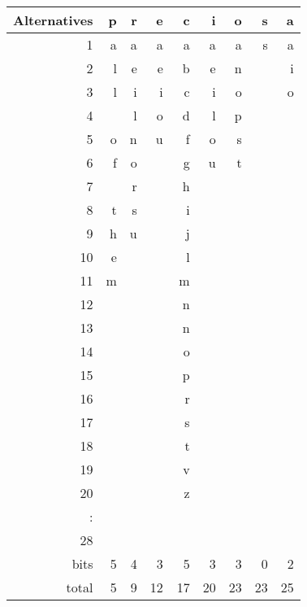 \documentclass{article}
\begin{document}
\thispagestyle{empty}
\begin{tabular}{r|rrrrrrrr}
    Alternatives & p & r & e & c & i & o & s & a\\
    \hline
     1 & a & a & a & a & a & a & s & a\\
     2 & l & e & e & b & e & n &   & i\\
     3 & l & i & i & c & i & o &   & o\\
     4 &   & l & o & d & l & p &   &\\
     5 & o & n & u & f & o & s &   &\\
     6 & f & o &   & g & u & t &   &\\
     7 &   & r &   & h &   &   &   &\\
     8 & t & s &   & i &   &   &   &\\
     9 & h & u &   & j &   &   &   &\\
    10 & e &   &   & l &   &   &   &\\
    11 & m &   &   & m &   &   &   &\\
    12 &   &   &   & n &   &   &   &\\
    13 &   &   &   & ~n &   &   &   &\\
    14 &   &   &   & o &   &   &   &\\
    15 &   &   &   & p &   &   &   &\\
    16 &   &   &   & r &   &   &   &\\
    17 &   &   &   & s &   &   &   &\\
    18 &   &   &   & t &   &   &   &\\
    19 &   &   &   & v &   &   &   &\\
    20 &   &   &   & z &   &   &   &\\
     : &   &   &   &   &   &   &   &\\
    28 &   &   &   &   &   &   &   &\\
    \hline
     bits & 5 & 4 & 3 & 5 & 3 & 3 & 0 & 2\\
     total & 5 & 9 & 12 & 17 & 20 & 23 & 23 & 25
\end{tabular}
\end{document}
